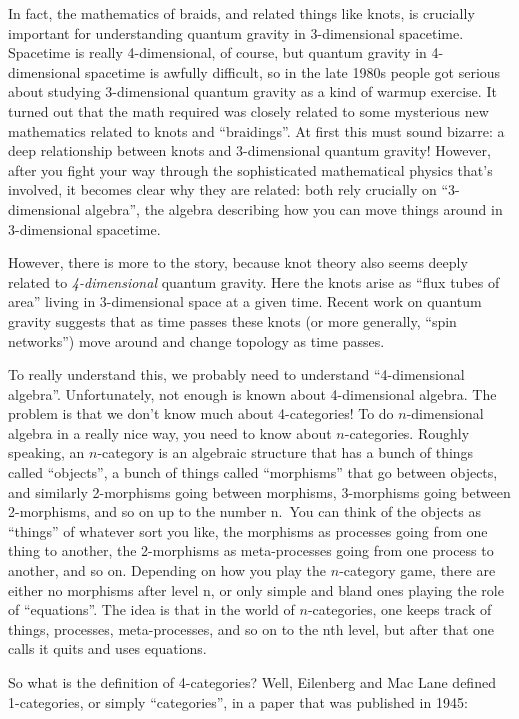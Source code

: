 \documentclass{article}
\begin{document}
In fact, the mathematics of braids, and related things like knots, is
crucially important for understanding quantum gravity in 3-dimensional
spacetime. Spacetime is really 4-dimensional, of course, but quantum
gravity in 4-dimensional spacetime is awfully difficult, so in the late
1980s people got serious about studying 3-dimensional quantum gravity as
a kind of warmup exercise. It turned out that the math required was
closely related to some mysterious new mathematics related to knots and
``braidings''. At first this must sound bizarre: a deep relationship
between knots and 3-dimensional quantum gravity! However, after you
fight your way through the sophisticated mathematical physics that's
involved, it becomes clear why they are related: both rely crucially on
``3-dimensional algebra'', the algebra describing how you can move
things around in 3-dimensional spacetime.

However, there is more to the story, because knot theory also seems
deeply related to \emph{4-dimensional} quantum gravity. Here the knots
arise as ``flux tubes of area'' living in 3-dimensional space at a given
time. Recent work on quantum gravity suggests that as time passes these
knots (or more generally, ``spin networks'') move around and change
topology as time passes.

To really understand this, we probably need to understand
``4-dimensional algebra''. Unfortunately, not enough is known about
4-dimensional algebra. The problem is that we don't know much about
4-categories! To do \(n\)-dimensional algebra in a really nice way, you
need to know about \(n\)-categories. Roughly speaking, an \(n\)-category
is an algebraic structure that has a bunch of things called ``objects'',
a bunch of things called ``morphisms'' that go between objects, and
similarly 2-morphisms going between morphisms, 3-morphisms going between
2-morphisms, and so on up to the number n.~You can think of the objects
as ``things'' of whatever sort you like, the morphisms as processes
going from one thing to another, the 2-morphisms as meta-processes going
from one process to another, and so on. Depending on how you play the
\(n\)-category game, there are either no morphisms after level n, or
only simple and bland ones playing the role of ``equations''. The idea
is that in the world of \(n\)-categories, one keeps track of things,
processes, meta-processes, and so on to the nth level, but after that
one calls it quits and uses equations.

So what is the definition of 4-categories? Well, Eilenberg and Mac Lane
defined 1-categories, or simply ``categories'', in a paper that was
published in 1945:
\end{document}
